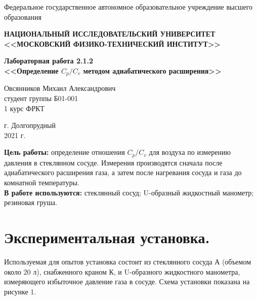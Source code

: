 \documentclass[a4paper,12pt]{article} %
\begin{document}
	\begin{center}
		
		\normalsize{Федеральное государственное автономное образовательное учреждение высшего образования}
		
		\textbf{НАЦИОНАЛЬНЫЙ ИССЛЕДОВАТЕЛЬСКИЙ УНИВЕРСИТЕТ \\ <<МОСКОВСКИЙ ФИЗИКО-ТЕХНИЧЕСКИЙ ИНСТИТУТ>>}
		\vspace{13ex}
		
		\textbf{Лабораторная работа 2.1.2 \\ <<Определение $C_{p}/C_{v}$ методом адиабатического расширения>> }
		\vspace{40ex}
		
		\normalsize{Овсянников Михаил Александрович \\ студент группы Б01-001\\ 1 курс ФРКТ\\}
	\end{center}
	
	\vfill 
	
	\begin{center}
		г. Долгопрудный\\ 
		2021 г.
	\end{center}
	
	\thispagestyle{empty} %
	
	\newpage

	\textbf{Цель работы:} определение отношения $C_{p}/C_{v}$ для воздуха по измерению давления в стеклянном сосуде. Измерения производятся сначала после адиабатического расширения газа, а затем после нагревания сосуда и газа до комнатной температуры.\\
	
	\textbf{В работе используются:} стеклянный сосуд; U-образный жидкостный манометр; резиновая груша.\\ 
	
	\section*{Экспериментальная установка.}
	
Используемая для опытов установка состоит из стеклянного сосуда А (объемом около 20 л), снабженного краном К, и U-образного жидкостного манометра, измеряющего избыточное давление газа в сосуде. Схема установки показана на рисунке 1.
	
\end{document}
